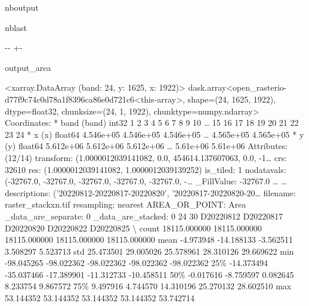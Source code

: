 \documentclass[letterpaper,10pt]{sphinxmanual}
\newlength\nbsphinxcodecellspacing
\begin{document}
\begin{sphinxuseclass}{nboutput}
\begin{sphinxuseclass}{nblast}
{

\kern-\sphinxverbatimsmallskipamount\kern-\baselineskip
\kern+\FrameHeightAdjust\kern-\fboxrule
\vspace{\nbsphinxcodecellspacing}

\begin{sphinxuseclass}{output_area}
\begin{sphinxuseclass}{}


\begin{sphinxVerbatim}[commandchars=\\\{\}]
<xarray.DataArray (band: 24, y: 1625, x: 1922)>
dask.array<open\_rasterio-d77f9c74c0d78a1f8396ca86e0d721c6<this-array>, shape=(24, 1625, 1922), dtype=float32, chunksize=(24, 1, 1922), chunktype=numpy.ndarray>
Coordinates:
  * band     (band) int32 1 2 3 4 5 6 7 8 9 10 {\ldots} 15 16 17 18 19 20 21 22 23 24
  * x        (x) float64 4.546e+05 4.546e+05 4.546e+05 {\ldots} 4.565e+05 4.565e+05
  * y        (y) float64 5.612e+06 5.612e+06 5.612e+06 {\ldots} 5.61e+06 5.61e+06
Attributes: (12/14)
    transform:           (1.0000012039141082, 0.0, 454614.137607063, 0.0, -1{\ldots}
    crs:                 32610
    res:                 (1.0000012039141082, 1.0000012039139252)
    is\_tiled:            1
    nodatavals:          (-32767.0, -32767.0, -32767.0, -32767.0, -32767.0, -{\ldots}
    \_FillValue:          -32767.0
    {\ldots}                  {\ldots}
    descriptions:        ('20220812-20220817-20220820', '20220817-20220820-20{\ldots}
    filename:            raster\_stackxn.tif
    resampling:          nearest
    AREA\_OR\_POINT:       Area
    \_data\_are\_separate:  0
    \_data\_are\_stacked:   0
24
30
          D20220812     D20220817     D20220820     D20220822     D20220825  \textbackslash{}
count  18115.000000  18115.000000  18115.000000  18115.000000  18115.000000
mean      -4.973948    -14.188133     -3.562511      3.508297      5.523713
std       25.473501     29.005026     25.578961     28.310126     29.669622
min      -98.045265    -98.022362    -98.022362    -98.022362    -98.022362
25\%      -14.373494    -35.037466    -17.389901    -11.312733    -10.458511
50\%       -0.017616     -8.759597      0.082645      8.233754      9.867572
75\%        9.497916      4.744570     14.310196     25.270132     28.602510
max       53.144352     53.144352     53.144352     53.144352     53.742714


\end{sphinxVerbatim}
\end{sphinxuseclass}
\end{sphinxuseclass}}
\end{sphinxuseclass}
\end{sphinxuseclass}
\end{document}

